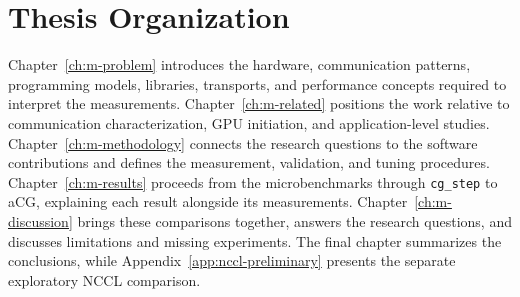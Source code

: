 \section{Thesis Organization}

Chapter~\ref{ch:m-problem} introduces the hardware, communication patterns, programming models, libraries, transports, and performance concepts required to interpret the measurements. Chapter~\ref{ch:m-related} positions the work relative to communication characterization, GPU initiation, and application-level studies. Chapter~\ref{ch:m-methodology} connects the research questions to the software contributions and defines the measurement, validation, and tuning procedures. Chapter~\ref{ch:m-results} proceeds from the microbenchmarks through \texttt{cg\_step} to aCG, explaining each result alongside its measurements. Chapter~\ref{ch:m-discussion} brings these comparisons together, answers the research questions, and discusses limitations and missing experiments. The final chapter summarizes the conclusions, while Appendix~\ref{app:nccl-preliminary} presents the separate exploratory NCCL comparison.
